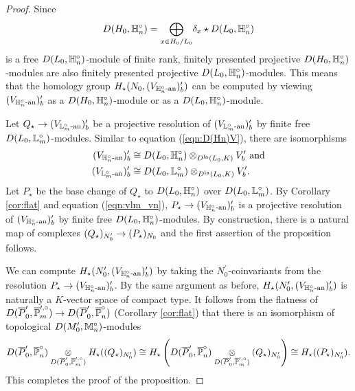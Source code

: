 \documentclass[10pt]{amsart}
\begin{document}
\begin{proof}
Since \begin{equation}
    \dn = \underset{x\in H_{0}/L_{0}}{\bigoplus} \delta_{x} \star D(L_{0},\h_{n}^{\circ})
\end{equation}
is a free $D(L_{0},\h_{n}^{\circ})$-module of finite rank, finitely presented projective $\dn$-modules are also finitely presented projective $D(L_{0},\h_{n}^{\circ})$-modules. This means that the homology group $H_{\star}(N_{0},\vn)$ can be computed by viewing $\vn$ as a $\dn$-module or as a $D(L_{0},\h_{n}^{\circ})$-module. 

Let $Q_{\star}\ra (V_{\L_{m}^{\circ}\An})^{\prime}_{b}$ be a projective resolution of $(V_{\L_{m}^{\circ}\An})^{\prime}_{b}$ by finite free $D(L_{0},\L_{m}^{\circ})$-modules. Similar to equation (\ref{eqn:D(Hn)V}), there are isomorphisms \begin{equation}\label{eqn:vlm_vn}\begin{split}
    \vn & \cong D(L_{0},\h_{n}^{\circ})\otimes_{D^{\La}(L_{0},K)}V^{\prime}_{b} \textnormal{ and} \\
    (V_{\L_{m}^{\circ}\An})^{\prime}_{b} & \cong D(L_{0},\L_{m}^{\circ})\otimes_{D^{\La}(L_{0},K)}V^{\prime}_{b}.
\end{split}\end{equation}
Let $P_{\star}$ be the base change of $Q_{\star}$ to $D(L_{0},\h_{n}^{\circ})$ over $D(L_{0},\L_{m}^{\circ})$. By Corollary \ref{cor:flat} and equation (\ref{eqn:vlm_vn}), $P_{\star}\ra \vn$ is a projective resolution of $\vn$ by finite free $D(L_{0},\h_{n}^{\circ})$-modules. By construction, there is a natural map of complexes $(Q_{\star})_{N_{0}^{\prime}}\ra (P_{\star})_{N_{0}}$ and the first assertion of the proposition follows.

We can compute $H_{\star}(N_{0}^{\prime},(V_{\h_{n}^{\circ}\An})^{\prime}_{b})$ by taking the $N_{0}^{\prime}$-coinvariants from the resolution $P_{\star}\ra \vn$. By the same argument as before, $H_{\star}(N_{0}^{\prime},(V_{\h_{n}^{\circ}\An})^{\prime}_{b})$ is naturally a $K$-vector space of compact type. It follows from the flatness of $D(\overline{P}^{\prime}_{0},\overline{\P}^{\prime,\circ}_{m}) \ra D(\overline{P}^{\prime}_{0},\overline{\P}_{n}^{\circ})$ (Corollary \ref{cor:flat}) that there is an isomorphism of topological $D(M_{0}^{\prime},\m_{n}^{\circ})$-modules \begin{equation*}\begin{split}
    D(\overline{P}^{\prime}_{0},\overline{\P}_{n}^{\circ})\underset{D(\overline{P}^{\prime}_{0},\overline{\P}^{\prime,\circ}_{m})}{\otimes} H_{\star}((Q_{\star})_{N_{0}^{\prime}}) \cong H_{\star}\left( D(\overline{P}^{\prime}_{0},\overline{\P}_{n}^{\circ})\underset{D(\overline{P}^{\prime}_{0},\overline{\P}^{\prime,\circ}_{m})}{\otimes} (Q_{\star})_{N_{0}^{\prime}}\right) \cong H_{\star}((P_{\star})_{N_{0}^{\prime}}).
\end{split} 
\end{equation*} This completes the proof of the proposition.   
\end{proof}
\end{document}
